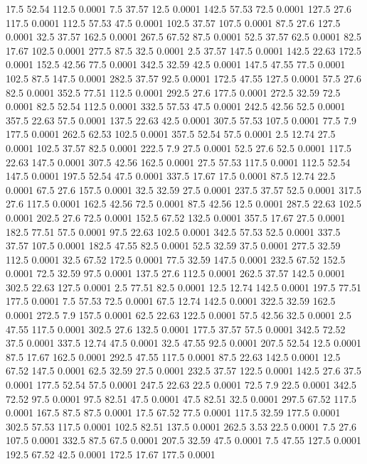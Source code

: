 17.5	52.54	112.5	0.0001
7.5	37.57	12.5	0.0001
142.5	57.53	72.5	0.0001
127.5	27.6	117.5	0.0001
112.5	57.53	47.5	0.0001
102.5	37.57	107.5	0.0001
87.5	27.6	127.5	0.0001
32.5	37.57	162.5	0.0001
267.5	67.52	87.5	0.0001
52.5	37.57	62.5	0.0001
82.5	17.67	102.5	0.0001
277.5	87.5	32.5	0.0001
2.5	37.57	147.5	0.0001
142.5	22.63	172.5	0.0001
152.5	42.56	77.5	0.0001
342.5	32.59	42.5	0.0001
147.5	47.55	77.5	0.0001
102.5	87.5	147.5	0.0001
282.5	37.57	92.5	0.0001
172.5	47.55	127.5	0.0001
57.5	27.6	82.5	0.0001
352.5	77.51	112.5	0.0001
292.5	27.6	177.5	0.0001
272.5	32.59	72.5	0.0001
82.5	52.54	112.5	0.0001
332.5	57.53	47.5	0.0001
242.5	42.56	52.5	0.0001
357.5	22.63	57.5	0.0001
137.5	22.63	42.5	0.0001
307.5	57.53	107.5	0.0001
77.5	7.9	177.5	0.0001
262.5	62.53	102.5	0.0001
357.5	52.54	57.5	0.0001
2.5	12.74	27.5	0.0001
102.5	37.57	82.5	0.0001
222.5	7.9	27.5	0.0001
52.5	27.6	52.5	0.0001
117.5	22.63	147.5	0.0001
307.5	42.56	162.5	0.0001
27.5	57.53	117.5	0.0001
112.5	52.54	147.5	0.0001
197.5	52.54	47.5	0.0001
337.5	17.67	17.5	0.0001
87.5	12.74	22.5	0.0001
67.5	27.6	157.5	0.0001
32.5	32.59	27.5	0.0001
237.5	37.57	52.5	0.0001
317.5	27.6	117.5	0.0001
162.5	42.56	72.5	0.0001
87.5	42.56	12.5	0.0001
287.5	22.63	102.5	0.0001
202.5	27.6	72.5	0.0001
152.5	67.52	132.5	0.0001
357.5	17.67	27.5	0.0001
182.5	77.51	57.5	0.0001
97.5	22.63	102.5	0.0001
342.5	57.53	52.5	0.0001
337.5	37.57	107.5	0.0001
182.5	47.55	82.5	0.0001
52.5	32.59	37.5	0.0001
277.5	32.59	112.5	0.0001
32.5	67.52	172.5	0.0001
77.5	32.59	147.5	0.0001
232.5	67.52	152.5	0.0001
72.5	32.59	97.5	0.0001
137.5	27.6	112.5	0.0001
262.5	37.57	142.5	0.0001
302.5	22.63	127.5	0.0001
2.5	77.51	82.5	0.0001
12.5	12.74	142.5	0.0001
197.5	77.51	177.5	0.0001
7.5	57.53	72.5	0.0001
67.5	12.74	142.5	0.0001
322.5	32.59	162.5	0.0001
272.5	7.9	157.5	0.0001
62.5	22.63	122.5	0.0001
57.5	42.56	32.5	0.0001
2.5	47.55	117.5	0.0001
302.5	27.6	132.5	0.0001
177.5	37.57	57.5	0.0001
342.5	72.52	37.5	0.0001
337.5	12.74	47.5	0.0001
32.5	47.55	92.5	0.0001
207.5	52.54	12.5	0.0001
87.5	17.67	162.5	0.0001
292.5	47.55	117.5	0.0001
87.5	22.63	142.5	0.0001
12.5	67.52	147.5	0.0001
62.5	32.59	27.5	0.0001
232.5	37.57	122.5	0.0001
142.5	27.6	37.5	0.0001
177.5	52.54	57.5	0.0001
247.5	22.63	22.5	0.0001
72.5	7.9	22.5	0.0001
342.5	72.52	97.5	0.0001
97.5	82.51	47.5	0.0001
47.5	82.51	32.5	0.0001
297.5	67.52	117.5	0.0001
167.5	87.5	87.5	0.0001
17.5	67.52	77.5	0.0001
117.5	32.59	177.5	0.0001
302.5	57.53	117.5	0.0001
102.5	82.51	137.5	0.0001
262.5	3.53	22.5	0.0001
7.5	27.6	107.5	0.0001
332.5	87.5	67.5	0.0001
207.5	32.59	47.5	0.0001
7.5	47.55	127.5	0.0001
192.5	67.52	42.5	0.0001
172.5	17.67	177.5	0.0001

